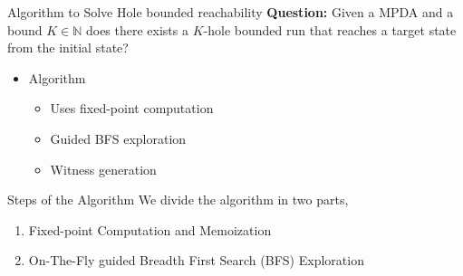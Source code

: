 \documentclass{beamer}
\begin{document}
\begin{frame}{Algorithm  to Solve Hole bounded reachability}
  \textbf{Question: } Given a MPDA and a bound $K\in \mathbb{N}$ does
  there exists a $K$-hole bounded run that reaches a target state from
  the initial state?
  
  \begin{itemize}
  \item Algorithm
    \begin{itemize}
  \item Uses fixed-point computation 
  \item Guided BFS exploration
    \item Witness generation
  \end{itemize}
\end{itemize}
\end{frame}
\begin{frame}[t]{Steps of the Algorithm}
  We divide the algorithm in two parts,
  \begin{enumerate}[<+->]
  \item Fixed-point Computation and Memoization\\
  \item On-The-Fly guided Breadth First Search (BFS) Exploration
  \end{enumerate}
\end{frame}
\end{document}
